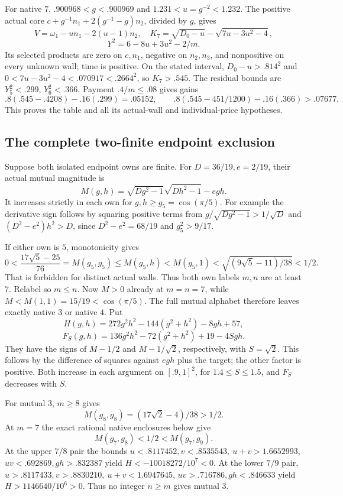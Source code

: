 For native \(7\),
\(.900968<g<.900969\) and \(1.231<u=g^{-2}<1.232\).
The positive actual core
\(c+g^{-1}n_1+2(g^{-1}-g)n_2\), divided by \(g\),
gives
\[
 V=\omega_1-un_1-2(u-1)n_2,\quad
 K_7=\sqrt{D_0-u}-\sqrt{7u-3u^2-4},
\]
\[
 Y^2=6-8u+3u^2-2/m.
\]
Its selected products are zero on \(c,n_1\),
negative on \(n_2,n_3\), and nonpositive on
every unknown wall; time is positive.
On the stated interval,
\(D_0-u>.814^2\) and
\(0<7u-3u^2-4<.070917<.2664^2\), so \(K_7>.545\).
The residual bounds are \(Y_5^2<.299\),
\(Y_6^2<.366\).
Payment \(.4/m\leq.08\) gives gains
\[
 .8(.545-.4208)-.16(.299)=.05152,\qquad
 .8(.545-451/1200)-.16(.366)>.07677.
\]
This proves the table and all its actual-wall
and individual-price hypotheses.
\subsection{The complete two-finite endpoint exclusion}
\label{app:A18finitepair}
Suppose both isolated endpoint owns are finite.
For \(D=36/19,e=2/19\), their actual mutual
magnitude is
\[
 M(g,h)=\sqrt{Dg^2-1}\sqrt{Dh^2-1}-egh.
\]
It increases strictly in each own for
\(g,h\geq g_5=\cos(\pi/5)\).
For example the derivative sign follows by
squaring positive terms from
\(g/\sqrt{Dg^2-1}>1/\sqrt D\) and
\((D^2-e^2)h^2>D\), since
\(D^2-e^2=68/19\) and \(g_5^2>9/17\).

If either own is \(5\), monotonicity gives
\[
 0<\frac{17\sqrt5-25}{76}=M(g_5,g_5)
 \leq M(g_5,h)<M(g_5,1)
 <\sqrt{(9\sqrt5-11)/38}<1/2.
\]
That is forbidden for distinct actual walls.
Thus both own labels \(m,n\) are at least \(7\).
Relabel so \(m\leq n\). Now \(M>0\) already
at \(m=n=7\), while
\(M<M(1,1)=15/19<\cos(\pi/5)\).
The full mutual alphabet therefore leaves
exactly native \(3\) or native \(4\).
Put
\[
 H(g,h)=272g^2h^2-144(g^2+h^2)-8gh+57,
\]
\[
 F_S(g,h)=136g^2h^2-72(g^2+h^2)+19-4Sgh.
\]
They have the signs of \(M-1/2\) and
\(M-1/\sqrt2\), respectively, with
\(S=\sqrt2\). This follows by the
difference of squares against \(egh\)
plus the target; the other factor is
positive. Both increase in each argument
on \([.9,1]^2\), for \(1.4\leq S\leq1.5\),
and \(F_S\) decreases with \(S\).

For mutual \(3\), \(m\geq8\) gives
\[
 M(g_8,g_8)=(17\sqrt2-4)/38>1/2.
\]
At \(m=7\) the exact rational native
enclosures below give
\[
 M(g_7,g_8)<1/2<M(g_7,g_9).
\]
At the upper \(7/8\) pair the bounds
\(u<.8117452,v<.8535543,\ u+v>1.6652993\),
\(uv<.692869,gh>.832387\) yield
\(H<-10018272/10^7<0\).
At the lower \(7/9\) pair,
\(u>.8117433,v>.8830210,\ u+v<1.6947645\),
\(uv>.716786,gh<.846633\) yield
\(H>1146640/10^6>0\).
Thus no integer \(n\geq m\) gives mutual \(3\).

